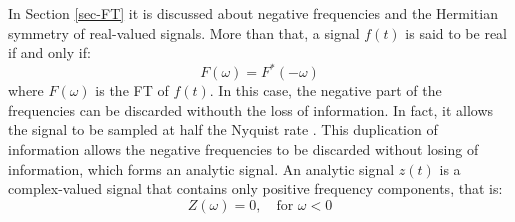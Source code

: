 In Section \ref{sec-FT} it is discussed about negative frequencies and the Hermitian symmetry of real-valued signals. More than that, a signal $f(t)$ is said to be real if and only if:
\begin{equation}
    F(\omega) = {F^*(-\omega)}
\end{equation}
\noindent where $F(\omega)$ is the FT of $f(t)$. In this case, the negative part of the frequencies can be discarded withouth the loss of information. In fact, it allows the signal to be sampled at half the Nyquist rate \cite{WignerDistBoashash}. This duplication of information allows the negative frequencies to be discarded without losing of information, which forms an analytic signal. An analytic signal $z(t)$ is a complex-valued signal that contains only positive frequency components, that is:
\begin{equation}
    Z(\omega) = 0, \quad \text{for } \omega < 0
\end{equation}

